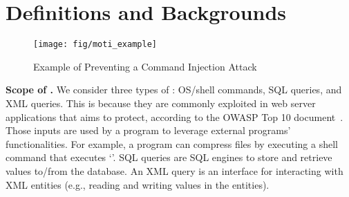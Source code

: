 
\section{Definitions and Backgrounds}
\label{sec:background}

\begin{figure*}[htp]
    \centering
    \texttt{[image: fig/moti\_example]}
    \vspace{-2em}
     \caption{Example of \sysname Preventing a Command Injection Attack}
     \vspace{-1em}
     \label{fig:moti_example}
\end{figure*}


\noindent
{\bf Scope of .}
We consider three types of : OS/shell commands, SQL queries, and XML queries.
This is because they are commonly exploited in web server applications that \sysname aims to protect, according to the OWASP Top 10 document~\cite{owasp_top_ten}. %
Those inputs are used by a program to leverage external programs' functionalities. For example, a program can compress files by executing a shell command that executes `'. 
SQL queries are  SQL engines to store and retrieve values to/from the database. An XML query is an interface for interacting with XML entities (e.g., reading and writing values in the entities).


